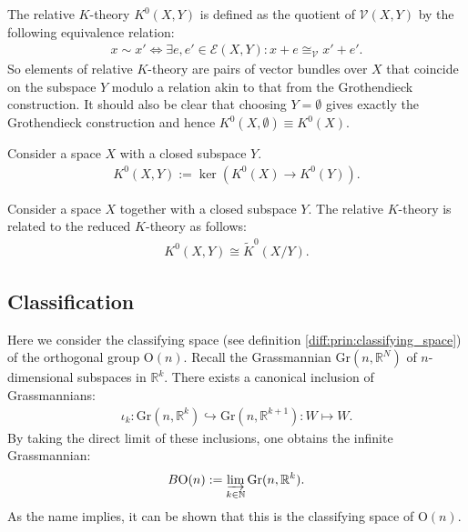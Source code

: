 {{        The relative $K$-theory $K^0(X, Y)$ is defined as the quotient of $\mathscr{V}(X, Y)$ by the following equivalence relation:
        \begin{gather}
            x\sim x' \iff \exists e,e'\in\mathscr{E}(X, Y):x+e\cong_{\mathscr{V}} x'+e'.
        \end{gather}
        So elements of relative $K$-theory are pairs of vector bundles over $X$ that coincide on the subspace $Y$ modulo a relation akin to that from the Grothendieck construction. It should also be clear that choosing $Y=\emptyset$ gives exactly the Grothendieck construction and hence $K^0(X, \emptyset) \equiv K^0(X)$.
    }
    \begin{adefinition}
        Consider a space $X$ with a closed subspace $Y$.
        \begin{gather}
            K^0(X, Y) := \ker\left(K^0(X)\rightarrow K^0(Y)\right).
        \end{gather}
    \end{adefinition}
    \begin{property}[Excision]\label{k:excision}
        Consider a space $X$ together with a closed subspace $Y$. The relative $K$-theory is related to the reduced $K$-theory as follows:
        \begin{gather}
            K^0(X, Y) \cong \widetilde{K}^0(X/Y).
        \end{gather}
    \end{property}

\subsection{Classification}

    \begin{property}
        Here we consider the classifying space (see definition \ref{diff:prin:classifying_space}) of the orthogonal group $\text{O}(n)$. Recall the Grassmannian $\text{Gr}(n, \mathbb{R}^N)$ of $n$-dimensional subspaces in $\mathbb{R}^k$. There exists a canonical inclusion of Grassmannians:
        \begin{gather}
            \iota_k:\text{Gr}(n, \mathbb{R}^k)\hookrightarrow \text{Gr}(n, \mathbb{R}^{k+1}):W\mapsto W.
        \end{gather}
        By taking the direct limit of these inclusions, one obtains the infinite Grassmannian:
        \begin{gather}
            B\text{O}(n) := \varinjlim_{k\in\mathbb{N}}\text{Gr}(n, \mathbb{R}^k).
        \end{gather}
        As the name implies, it can be shown that this is the classifying space of $\text{O}(n)$.


\end{property}}
